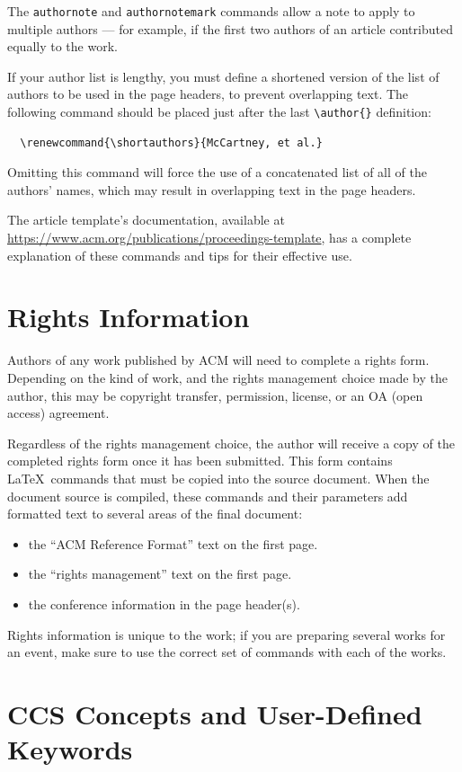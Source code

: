 \documentclass[sigconf]{acmart}
\begin{document}
The \verb|authornote| and \verb|authornotemark| commands allow a note
to apply to multiple authors --- for example, if the first two authors
of an article contributed equally to the work.

If your author list is lengthy, you must define a shortened version of
the list of authors to be used in the page headers, to prevent
overlapping text. The following command should be placed just after
the last \verb|\author{}| definition:
\begin{verbatim}
  \renewcommand{\shortauthors}{McCartney, et al.}
\end{verbatim}
Omitting this command will force the use of a concatenated list of all
of the authors' names, which may result in overlapping text in the
page headers.

The article template's documentation, available at
\url{https://www.acm.org/publications/proceedings-template}, has a
complete explanation of these commands and tips for their effective
use.

\section{Rights Information}

Authors of any work published by ACM will need to complete a rights
form. Depending on the kind of work, and the rights management choice
made by the author, this may be copyright transfer, permission,
license, or an OA (open access) agreement.

Regardless of the rights management choice, the author will receive a
copy of the completed rights form once it has been submitted. This
form contains \LaTeX\ commands that must be copied into the source
document. When the document source is compiled, these commands and
their parameters add formatted text to several areas of the final
document:
\begin{itemize}
\item the ``ACM Reference Format'' text on the first page.
\item the ``rights management'' text on the first page.
\item the conference information in the page header(s).
\end{itemize}

Rights information is unique to the work; if you are preparing several
works for an event, make sure to use the correct set of commands with
each of the works.

\section{CCS Concepts and User-Defined Keywords}
\end{document}
